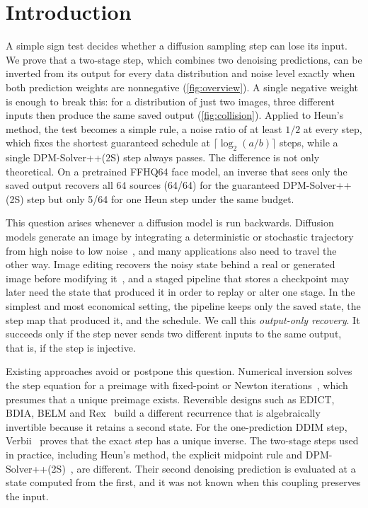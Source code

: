\section{Introduction}
A simple sign test decides whether a diffusion sampling step can lose its input. We prove that a two-stage step, which combines two denoising predictions, can be inverted from its output for every data distribution and noise level exactly when both prediction weights are nonnegative (\cref{fig:overview}). A single negative weight is enough to break this: for a distribution of just two images, three different inputs then produce the same saved output (\cref{fig:collision}). Applied to Heun's method, the test becomes a simple rule, a noise ratio of at least $1/2$ at every step, which fixes the shortest guaranteed schedule at $\lceil\log_2(a/b)\rceil$ steps, while a single DPM-Solver++(2S) step always passes. The difference is not only theoretical. On a pretrained FFHQ64 face model, an inverse that sees only the saved output recovers all 64 sources (64/64) for the guaranteed DPM-Solver++(2S) step but only 5/64 for one Heun step under the same budget.

This question arises whenever a diffusion model is run backwards. Diffusion models generate an image by integrating a deterministic or stochastic trajectory from high noise to low noise~\cite{ho2020,songsde2021,karras2022}, and many applications also need to travel the other way. Image editing recovers the noisy state behind a real or generated image before modifying it~\cite{songddim2021,mokady2023,wallace2023}, and a staged pipeline that stores a checkpoint may later need the state that produced it in order to replay or alter one stage. In the simplest and most economical setting, the pipeline keeps only the saved state, the step map that produced it, and the schedule. We call this \emph{output-only recovery}. It succeeds only if the step never sends two different inputs to the same output, that is, if the step is injective.

Existing approaches avoid or postpone this question. Numerical inversion solves the step equation for a preimage with fixed-point or Newton iterations~\cite{hong2024}, which presumes that a unique preimage exists. Reversible designs such as EDICT, BDIA, BELM and Rex~\cite{wallace2023,zhang2024,wang2024,rex2026} build a different recurrence that is algebraically invertible because it retains a second state. For the one-prediction DDIM step, Verbii~\cite{verbii2026} proves that the exact step has a unique inverse. The two-stage steps used in practice, including Heun's method, the explicit midpoint rule and DPM-Solver++(2S)~\cite{karras2022,lu2022}, are different. Their second denoising prediction is evaluated at a state computed from the first, and it was not known when this coupling preserves the input.

